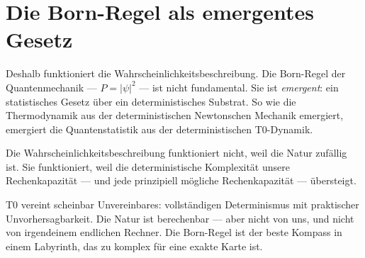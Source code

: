 \section{Die Born-Regel als emergentes Gesetz}

Deshalb funktioniert die Wahrscheinlichkeitsbeschreibung. Die Born-Regel der Quantenmechanik --- $P = |\psi|^2$ --- ist nicht fundamental. Sie ist \emph{emergent}: ein statistisches Gesetz über ein deterministisches Substrat. So wie die Thermodynamik aus der deterministischen Newtonschen Mechanik emergiert, emergiert die Quantenstatistik aus der deterministischen T0-Dynamik.

Die Wahrscheinlichkeitsbeschreibung funktioniert nicht, weil die Natur zufällig ist. Sie funktioniert, weil die deterministische Komplexität unsere Rechenkapazität --- und jede prinzipiell mögliche Rechenkapazität --- übersteigt.

\begin{kerngedanke}
T0 vereint scheinbar Unvereinbares: vollständigen Determinismus mit praktischer Unvorhersagbarkeit. Die Natur ist berechenbar --- aber nicht von uns, und nicht von irgendeinem endlichen Rechner. Die Born-Regel ist der beste Kompass in einem Labyrinth, das zu komplex für eine exakte Karte ist.
\end{kerngedanke}
